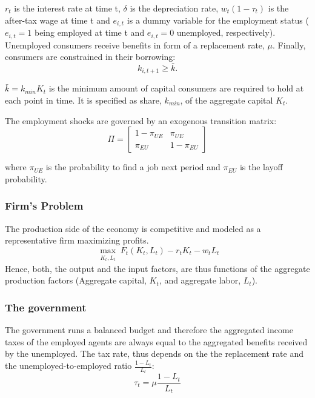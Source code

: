 \documentclass[a4paper,11pt]{article}
\begin{document}
$r_{t}$ is the interest rate at time t, $\delta$ is the depreciation rate, $w_{t}(1-\tau_{t})$ is the after-tax wage at time t and $e_{i,t}$ is a dummy variable for the employment status ($e_{i,t}=1$ being employed at time t and $ e_{i,t}=0$ unemployed, respectively). Unemployed consumers receive benefits in form of a replacement rate, $\mu$. Finally, consumers are constrained in their borrowing:
   \begin{equation}
  \label{eq:borconstraint}
   k_{i,t + 1} \geq \bar{k}. \nonumber
 	 \end{equation}
 	 
$\bar{k} = k_{min}K_{t}$ is the minimum amount of capital consumers are required to hold at each point in time. It is specified as share, $k_{min}$, of the aggregate capital $K_{t}$.  

The employment shocks are governed by an exogenous transition matrix: 
\[ \Pi = \begin{bmatrix}
1-\pi_{UE} & \pi_{UE} \\
 \pi_{EU} & 1-\pi_{EU}
\end{bmatrix}
\]

where $\pi_{UE}$ is the probability to find a job next period and $\pi_{EU}$ is the layoff probability. 

\subsubsection*{Firm's Problem}

The production side of the economy is competitive and modeled as a representative firm maximizing profits. 
\[ \max_{\substack{K_{t},L_{t}}}F_{t}(K_{t},L_{t})-r_{t}K_{t}-w_{t}L_{t}
\]
Hence, both, the output and the input factors, are thus functions of the aggregate production factors (Aggregate capital, $K_{t}$, and aggregate labor, $L_{t}$).

\subsubsection*{The government}

The government runs a balanced budget and therefore the aggregated income taxes of the employed agents are always equal to the aggregated benefits received by the unemployed. The tax rate, thus depends on the the replacement rate and the unemployed-to-employed ratio $\frac{1-L_{t}}{L_{t}}$:
\begin{equation}
  \label{eq:balancedbudget}
\tau_{t}=\mu\frac{1-L_{t}}{L_{t}}
\end{equation}
\end{document}
